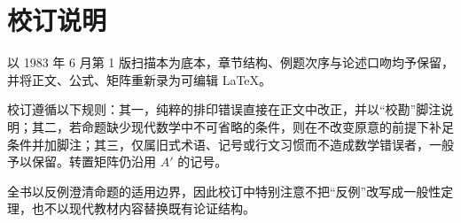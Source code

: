 \chapter*{校订说明}
以 1983 年 6 月第 1 版扫描本为底本，章节结构、例题次序与论述口吻均予保留，并将正文、公式、矩阵重新录为可编辑 LaTeX。

校订遵循以下规则：其一，纯粹的排印错误直接在正文中改正，并以“校勘”脚注说明；其二，若命题缺少现代数学中不可省略的条件，则在不改变原意的前提下补足条件并加脚注；其三，仅属旧式术语、记号或行文习惯而不造成数学错误者，一般予以保留。转置矩阵仍沿用 $A'$ 的记号。

全书以反例澄清命题的适用边界，因此校订中特别注意不把“反例”改写成一般性定理，也不以现代教材内容替换既有论证结构。
